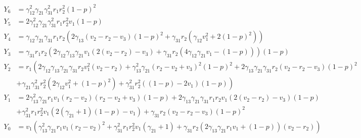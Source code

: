 \begin{align*}
    Y_6 &= \gamma_{12}^2\gamma_{21}\gamma_{31}^2r_1r_2^2\left(1-p\right)^2\\
    Y_5 &= 2\gamma_{12}^2\gamma_{21}\gamma_{31}^2r_1r_2^2v_1\left(1-p\right)\\
    Y_4 &= \gamma_{12}\gamma_{21}\gamma_{31}r_1r_2\left(2\gamma_{13}\left(v_2-r_2-v_3\right)\left(1-p\right)^2+\gamma_{31}r_2\left(\gamma_{12}v_1^2+2\left(1-p\right)^2\right)\right)\\
    Y_3 &= \gamma_{31}r_1r_2\left(2\gamma_{12}\gamma_{13}\gamma_{21}v_1\left(2\left(v_2-r_2\right)-v_3\right)+\gamma_{31}r_2\left(4\gamma_{12}\gamma_{21}v_1-\left(1-p\right)\right)\right)\left(1-p\right)\\
    Y_2 &= r_1\left(2\gamma_{12}\gamma_{13}\gamma_{21}\gamma_{31}r_2v_1^2\left(v_2-r_2\right)+\gamma_{13}^2\gamma_{21}\left(r_2-v_2+v_3\right)^2\left(1-p\right)^2+2\gamma_{13}\gamma_{21}\gamma_{31}r_2\left(v_2-r_2-v_3\right)\left(1-p\right)^2\right.\\
    &\left.+\gamma_{21}\gamma_{31}^2r_2^2\left(2\gamma_{12}v_1^2+\left(1-p\right)^2\right)+\gamma_{31}^2r_2^2\left(\left(1-p\right)-2v_1\right)\left(1-p\right)\right)\\
    Y_1 &= 2\gamma_{13}^2\gamma_{21}r_1v_1\left(r_2-v_2\right)\left(r_2-v_2+v_3\right)\left(1-p\right)+2\gamma_{13}\gamma_{21}\gamma_{31}r_1r_2v_1\left(2\left(v_2-r_2\right)-v_3\right)\left(1-p\right)\\
    &+\gamma_{31}^2r_1r_2^2v_1\left(2\left(\gamma_{21}+1\right)\left(1-p\right)-v_1\right)+\gamma_{31}r_2\left(v_2-r_2-v_3\right)\left(1-p\right)^2\\
    Y_0 &= v_1\left(\gamma_{13}^2\gamma_{21}r_1v_1\left(r_2-v_2\right)^2+\gamma_{31}^2r_1r_2^2v_1\left(\gamma_{21}+1\right)+\gamma_{31}r_2\left(2\gamma_{13}\gamma_{21}r_1v_1+\left(1-p\right)\right)\left(v_2-r_2\right)\right)
\end{align*}
